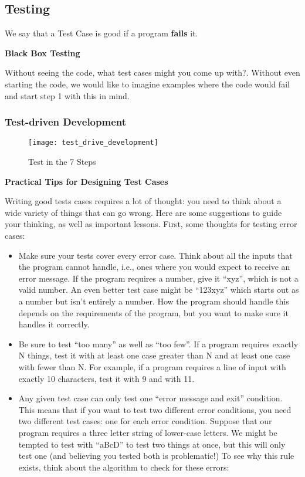 \documentclass[11pt, a4paper]{article}
\begin{document}
\subsection{Testing}%
\label{sub:testing}


We say that a Test Case is good if a program \textbf{fails} it. 

\textbf{Black Box Testing}

Without seeing the code, what test cases might you come up with?. Without even starting the code, we would like to imagine examples where the code would fail and start step 1 with this in mind. 


\subsubsection{Test-driven Development}%
\label{ssub:test_driven_development}

\begin{figure}[htpb]
  \centering
  \texttt{[image: test\_drive\_development]}
  \caption{Test in the 7 Steps}
  \label{fig:test_driven_development}
\end{figure}


\textbf{Practical Tips for Designing Test Cases}

Writing good tests cases requires a lot of thought: you need to think about a wide variety of things that can go wrong. Here are some suggestions to guide your thinking, as well as important lessons. First, some thoughts for testing error cases:

\begin{itemize}
  \item Make sure your tests cover every error case. Think about all the inputs that the program cannot handle, i.e., ones where you would expect to receive an error message. If the program requires a number, give it “xyz”, which is not a valid number. An even better test case might be “123xyz” which starts out as a number but isn’t entirely a number. How the program should handle this depends on the requirements of the program, but you want to make sure it handles it correctly.
  \item Be sure to test “too many” as well as “too few”. If a program requires exactly N things, test it with at least one case greater than N and at least one case with fewer than N. For example, if a program requires a line of input with exactly 10 characters, test it with 9 and with 11.
  \item Any given test case can only test one “error message and exit” condition. This means that if you want to test two different error conditions, you need two different test cases: one for each error condition. Suppose that our program requires a three letter string of lower-case letters. We might be tempted to test with “aBcD” to test two things at once, but this will only test one (and believing you tested both is problematic!) To see why this rule exists, think about the algorithm to check for these errors:
\end{itemize}
\end{document}
